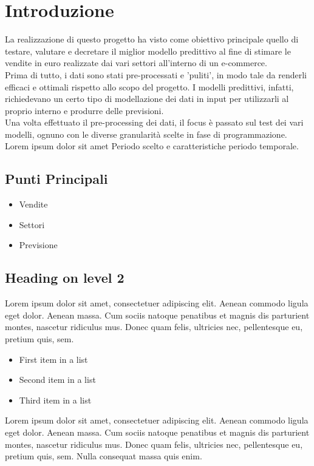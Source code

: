 \documentclass[12pt, a4paper, twocolumn]{article} %
\begin{document}
\clearpage
\bigskip
\tableofcontents


\section{Introduzione}
La realizzazione di questo progetto ha visto come obiettivo principale quello di testare, valutare e decretare il miglior modello predittivo al fine di stimare le vendite in euro realizzate dai vari settori all'interno di un e-commerce.\\
Prima di tutto, i dati sono stati pre-processati e 'puliti', in modo tale da renderli efficaci e ottimali rispetto allo scopo del progetto. I modelli predittivi, infatti, richiedevano un certo tipo di modellazione dei dati in input per utilizzarli al proprio interno e produrre delle previsioni.\\
Una volta effettuato il pre-processing dei dati, il focus è passato sul test dei vari modelli, ognuno con le diverse granularità scelte in fase di programmazione.\\
Lorem ipsum dolor sit amet %
Periodo scelto e caratteristiche periodo temporale.

\subsection{Punti Principali}
\begin{itemize}
	\item Vendite 
	\item Settori 
	\item Previsione
\end{itemize}

\subsection*{Heading on level 2}
Lorem ipsum dolor sit amet, consectetuer adipiscing elit. Aenean commodo ligula eget dolor. Aenean massa. Cum sociis natoque penatibus et magnis dis parturient montes, nascetur ridiculus mus. Donec quam felis, ultricies nec, pellentesque eu, pretium quis, sem.
\bigskip

\begin{itemize}
	\item First item in a list 
	\item Second item in a list 
	\item Third item in a list
\end{itemize}
Lorem ipsum dolor sit amet, consectetuer adipiscing elit. Aenean commodo ligula eget dolor. Aenean massa. Cum sociis natoque penatibus et magnis dis parturient montes, nascetur ridiculus mus. Donec quam felis, ultricies nec, pellentesque eu, pretium quis, sem. Nulla consequat massa quis enim. 
\end{document}
